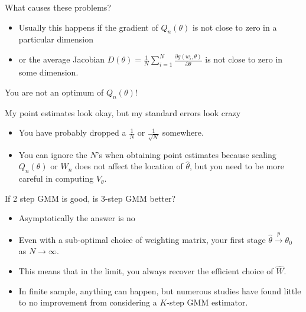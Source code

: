 \documentclass[aspectratio=169]{beamer}
\begin{document}
\begin{frame}{What causes these problems?}
\begin{itemize}
\item Usually this happens if the gradient of $Q_n(\theta)$ is not close to zero in a particular dimension 
\item or the average Jacobian $D(\theta)=\frac{1}{N} \sum_{i=1}^N \frac{\partial g(w_i,\theta)}{\partial \theta}$ is not close to zero in some dimension.
\end{itemize}
You are not an optimum of $Q_n(\theta)$!
\end{frame}


\begin{frame}{My point estimates look okay, but my standard errors look crazy}
\begin{itemize}
\item You have probably dropped a $\frac{1}{N}$ or $\frac{1}{\sqrt{N}}$ somewhere.
\item  You can ignore the $N$'s when obtaining point estimates because scaling $Q_n(\theta)$ or $W_n$ does not affect the location of $\hat{\theta}$, but you need to be more careful in computing $V_{\theta}$.
\end{itemize}
\end{frame}

\begin{frame}{If 2 step GMM is good, is 3-step GMM better?}
\begin{itemize}
\item Asymptotically the answer is no
\item Even with a sub-optimal choice of weighting matrix, your first stage  $\hat{\theta} \overset{p}{\to}\theta_0$ as $N \rightarrow \infty$.
\item  This means that in the limit, you always recover the efficient choice of $\hat{W}$.
\item  In finite sample, anything can happen, but numerous studies have found little to no improvement from considering a $K$-step GMM estimator.
\end{itemize}
\end{frame}
\end{document}
